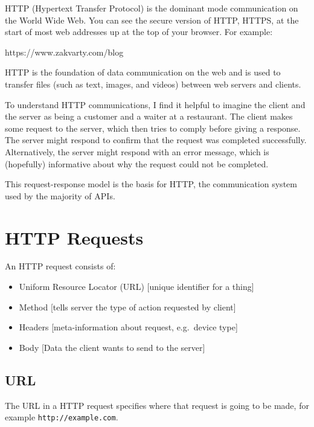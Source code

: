 \documentclass[
  letterpaper,
  DIV=11,
  numbers=noendperiod]{scrreprt}
\newenvironment{Shaded}{\begin{snugshade}}{\end{snugshade}}
\newcommand{\NormalTok}[1]{\textcolor[rgb]{0.00,0.23,0.31}{#1}}
\providecommand{\tightlist}{%
  \setlength{\itemsep}{0pt}\setlength{\parskip}{0pt}}\usepackage{longtable,booktabs,array}
\begin{document}
HTTP (Hypertext Transfer Protocol) is the dominant mode communication on
the World Wide Web. You can see the secure version of HTTP, HTTPS, at
the start of most web addresses up at the top of your browser. For
example:

\begin{Shaded}
\begin{Highlighting}[]
\NormalTok{https://www.zakvarty.com/blog}
\end{Highlighting}
\end{Shaded}

HTTP is the foundation of data communication on the web and is used to
transfer files (such as text, images, and videos) between web servers
and clients.

To understand HTTP communications, I find it helpful to imagine the
client and the server as being a customer and a waiter at a restaurant.
The client makes some request to the server, which then tries to comply
before giving a response. The server might respond to confirm that the
request was completed successfully. Alternatively, the server might
respond with an error message, which is (hopefully) informative about
why the request could not be completed.

This request-response model is the basis for HTTP, the communication
system used by the majority of APIs.

\section{HTTP Requests}\label{http-requests}

An HTTP request consists of:

\begin{itemize}
\tightlist
\item
  Uniform Resource Locator (URL) {[}unique identifier for a thing{]}
\item
  Method {[}tells server the type of action requested by client{]}
\item
  Headers {[}meta-information about request, e.g.~device type{]}
\item
  Body {[}Data the client wants to send to the server{]}
\end{itemize}

\subsection{URL}\label{url}

The URL in a HTTP request specifies where that request is going to be
made, for example \texttt{http://example.com}.
\end{document}
